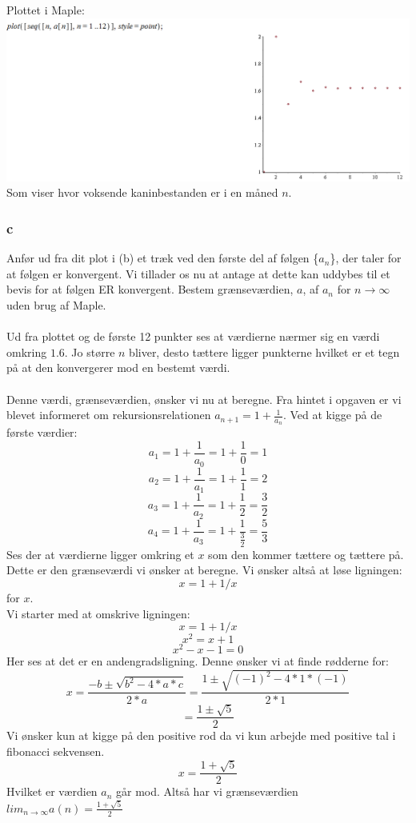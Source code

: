 \documentclass[12pt]{article}
\begin{document}
\newpage
Plottet i Maple:\\
\includegraphics[scale=0.6]{Pic13}
Som viser hvor voksende kaninbestanden er i en måned $n$.

\subsubsection*{c}
Anfør ud fra dit plot i (b) et træk ved den første del af følgen \{$a_n$\}, der taler for at følgen er konvergent. Vi tillader os nu at antage at dette kan uddybes til et bevis for at følgen ER konvergent. Bestem grænseværdien, $a$, af $a_n$ for $n\rightarrow\infty$ uden brug af Maple.\\
\\
Ud fra plottet og de første 12 punkter ses at værdierne nærmer sig en værdi omkring $1.6$. Jo større $n$ bliver, desto tættere ligger punkterne hvilket er et tegn på at den konvergerer mod en bestemt værdi.\\
\\
Denne værdi, grænseværdien, ønsker vi nu at beregne. Fra hintet i opgaven er vi blevet informeret om rekursionsrelationen $a_{n+1}=1+\frac{1}{a_n}$. Ved at kigge på de første værdier:\\
$$a_1=1+\frac{1}{a_0}=1+\frac{1}{0}=1$$
$$a_2=1+\frac{1}{a_1}=1+\frac{1}{1}=2$$
$$a_3=1+\frac{1}{a_2}=1+\frac{1}{2}=\frac{3}{2}$$
$$a_4=1+\frac{1}{a_3}=1+\frac{1}{\frac{3}{2}}=\frac{5}{3}$$
Ses der at værdierne ligger omkring et $x$ som den kommer tættere og tættere på. Dette er den grænseværdi vi ønsker at beregne. Vi ønsker altså at løse ligningen:
$$x=1+1/x$$
for $x$.\\
Vi starter med at omskrive ligningen:
$$x=1+1/x$$
$$x^2=x+1$$
$$x^2-x-1=0$$
Her ses at det er en andengradsligning. Denne ønsker vi at finde rødderne for:
$$x=\frac{-b\pm\sqrt{b^2-4*a*c}}{2*a}=\frac{1\pm\sqrt{(-1)^2-4*1*(-1)}}{2*1}$$
$$=\frac{1\pm\sqrt{5}}{2}$$
Vi ønsker kun at kigge på den positive rod da vi kun arbejde med positive tal i fibonacci sekvensen.
$$x=\frac{1+\sqrt{5}}{2}$$
Hvilket er værdien $a_n$ går mod. Altså har vi grænseværdien $lim_{n\rightarrow\infty}a(n)=\frac{1+\sqrt{5}}{2}$
\end{document}
